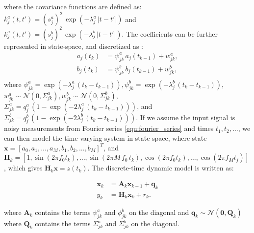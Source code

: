\documentclass[portrait,a0,final]{a0poster} %
\begin{document}
\begin{minipage}{0.98\linewidth}
\begin{minipage}[t]{0.47\linewidth}
where the covariance functions are defined as: $k^a_j(t,t') = (s^a_j)^2 \, \exp( -\lambda^a_j \, | t - t' | )$ and $k^a_j(t,t') = (s^b_j)^2 \, \exp( -\lambda^b_j \, | t - t' | )$. The coefficients can be further represented in state-space, and discretized as \cite{Sarkka:2006}: 
%
%
\begin{equation}
\begin{split}
a_j(t_k) &= \psi^a_{jk} \, a_j(t_{k-1}) + w^a_{jk}, \\
b_j(t_k) &= \psi^b_{jk} \, b_j(t_{k-1}) + w^b_{jk}, \\
\end{split}
\label{eq:discdyn}
\end{equation}
%
where $\psi^a_{jk} = \exp(-\lambda^a_j \, (t_k - t_{k-1})), \psi^b_{jk} = \exp(-\lambda^b_j \, (t_k - t_{k-1}))$, $w^a_{jk} \sim \mathcal{N}(0,\Sigma^a_{jk}), w^b_{jk} \sim \mathcal{N}(0,\Sigma^b_{jk})$, $\Sigma^a_{jk} = q^a_j \, (1 - \exp(-2 \lambda^a_j \, (t_k - t_{k-1})))$, and $\Sigma^b_{jk} = q^b_j \, (1 - \exp(-2 \lambda^b_j \, (t_k - t_{k-1})))$. If we assume the input signal is noisy measurements from Fourier series \eqref{equ:fourier_series} and times $t_1,t_2,\ldots$, we can then model the time-varying system in state space, where state $\mathbf{x} = [a_{0}, a_{1}, ..., a_{M}, b_{1}, b_{2}, ..., b_{M}]^T$, and $\mathbf{H}_k = [1, \sin(2\pi f_0 t_k), \ldots, \sin(2\pi M \, f_0 \, t_k), \cos(2\pi f_0 t_k), \ldots, \cos(2\pi f_M t_j)]$, which gives $\mathbf{H}_k \mathbf{x}=z(t_k)$. The discrete-time dynamic model is written as:

\begin{equation}
\begin{split}
\mathbf{x}_k &= \mathbf{A}_{k} \mathbf{x}_{k-1} + \mathbf{q}_{k} \\
y_k &= \mathbf{H}_k \mathbf{x}_k + r_k.
\end{split}
\label{eq:dynmodel}
\end{equation}

where $\mathbf{A}_k$ contains the terms $\psi^a_{jk}$ and $\phi^b_{jk}$ on the diagonal and $ \mathbf{q}_{k} \sim \mathcal{N}(\mathbf{0},\mathbf{Q}_k)$ where $\mathbf{Q}_k$ contains the terms $\Sigma^a_{jk}$ and $\Sigma^b_{jk}$ on the diagonal.


\end{minipage}
\end{minipage}
\end{document}
